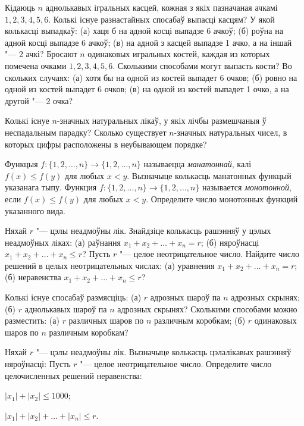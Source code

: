 \begin{problemList}
\bigskip

\problemItemSimple
{Кідаюць $n$ аднолькавых ігральных касцей, кожная з якіх пазначаная ачкамі $1, 2, 3, 4, 5, 6$.
Колькі існуе разнастайных спосабаў выпасці касцям? У якой колькасці выпадкаў:
(а) хаця б на адной косці выпадзе 6 ачкоў; (б) роўна на адной косці выпадзе 6 ачкоў;
(в) на адной з касцей выпадзе 1 ачко, а на іншай "--- 2 ачкі?}
{Бросают $n$ одинаковых игральных костей, каждая из которых помечена
очками $1, 2, 3, 4, 5, 6$. Сколькими способами могут выпасть кости?
Во скольких случаях: (а) хотя бы на одной из костей выпадет 6 очков;
(б) ровно на одной из костей выпадет 6 очков; (в) на одной из костей
выпадет 1 очко, а на другой "--- 2 очка?}

\bigskip

\problemItemSimple
{Колькі існуе $n$-значных натуральных лікаў, у якіх лічбы размешчаныя ў неспадальным парадку?}
{Сколько существует $n$-значных натуральных чисел, в
которых цифры расположены в неубывающем порядке?}

\bigskip

\problemItemSimple
{Функцыя $f \colon \{1, 2, \ldots, n\} \to \{1, 2, \ldots, n\}$
называецца \emph{манатоннай}, калі $f(x) \le f(y)$ для любых $x < y$.
Вызначыце колькасць манатонных функцый указанага тыпу.}
{Функция $f \colon \{1, 2, \ldots, n\} \to \{1, 2, \ldots, n\}$
называется \emph{монотонной}, если $f(x) \le f(y)$ для любых $x < y$.
Определите число монотонных функций указанного вида.}

\bigskip

\problemItemSimple
{Няхай $r$ "--- цэлы неадмоўны лік. Знайдзіце колькасць рашэнняў у цэлых
неадмоўных ліках: (а) раўнання $x_1 + x_2 + \ldots + x_n = r$;
(б) няроўнасці $x_1 + x_2 + \ldots + x_n \le r$?}
{Пусть $r$ "--- целое неотрицательное число. Найдите число решений в
целых неотрицательных числах: (а) уравнения
$x_1 + x_2 + \ldots + x_n = r$; (б) неравенства
$x_1 + x_2 + \ldots + x_n \le r$?}

\bigskip

\problemItemSimple
{Колькі існуе спосабаў размясціць: (а) $r$ адрозных шароў па $n$
адрозных скрынях; (б) $r$ аднолькавых шароў па $n$ адрозных скрынях?}
{Сколькими способами можно разместить: (а) $r$ различных шаров по $n$
различным коробкам; (б) $r$ одинаковых шаров по $n$ различным коробкам?}

\bigskip

\problemItemWithCommonPart
{Няхай $r$ "--- цэлы неадмоўны лік. Вызначыце колькасць цэлалікавых рашэнняў няроўнасці:}
{Пусть $r$ "--- целое неотрицательное число. Определите число
целочисленных решений неравенства:}
{%
\begin{belarusianEnumerate}
    \item $|x_1| + |x_2| \le 1000$;
    \item $|x_1| + |x_2| + \ldots + |x_n| \le r$.
\end{belarusianEnumerate}
}


\end{problemList}
